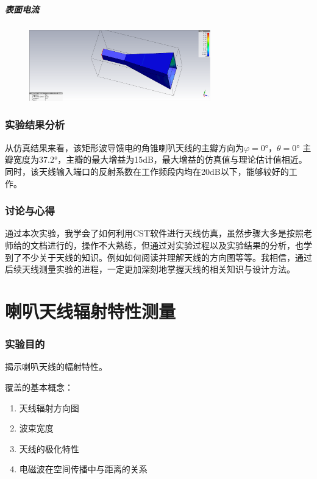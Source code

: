 \documentclass{../source/zjureport}
\begin{document}
            \subsubsection{表面电流}
            \begin{figure}[htp]
                \centering
                \includegraphics[width = 0.7\textwidth]{figure/表面电流.png}
            \end{figure}
    \section{实验结果分析}
    从仿真结果来看，该矩形波导馈电的角锥喇叭天线的主瓣方向为$\varphi = 0° ， \theta  = 0°$ 主瓣宽度为37.2°，主瓣的最大增益为15dB，最大增益的仿真值与理论估计值相近。同时，该天线输入端口的反射系数在工作频段内均在20dB以下，能够较好的工作。

    \section{讨论与心得}
    通过本次实验，我学会了如何利用CST软件进行天线仿真，虽然步骤大多是按照老师给的文档进行的，操作不大熟练，但通过对实验过程以及实验结果的分析，也学到了不少关于天线的知识。例如如何阅读并理解天线的方向图等等。我相信，通过后续天线测量实验的进程，一定更加深刻地掌握天线的相关知识与设计方法。

    \part{喇叭天线辐射特性测量}
    \section{实验目的}
    揭示喇叭天线的幅射特性。

    覆盖的基本概念：
    \begin{enumerate}
        \item 天线辐射方向图
        \item 波束宽度
        \item 天线的极化特性
        \item 电磁波在空间传播中与距离的关系
    \end{enumerate}
\end{document}
